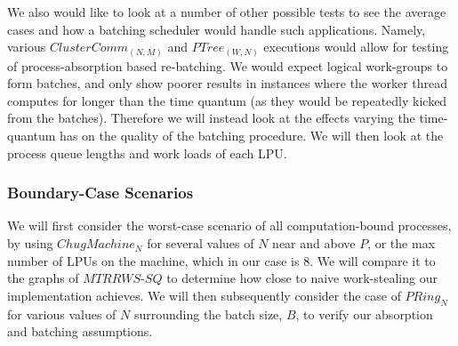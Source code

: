 We also would like to look at a number of other possible tests to see the
average cases and how a batching scheduler would handle such applications.
Namely, various $ClusterComm_{(N,M)}$ and $PTree_{(W,N)}$ executions would allow 
for testing of process-absorption based re-batching. We would expect logical
work-groups to form batches, and only show poorer results in instances where
the worker thread computes for longer than the time quantum (as they would be
repeatedly kicked from the batches). Therefore we will instead look at the
effects varying the time-quantum has on the quality of the batching procedure.
We will then look at the process queue lengths and work loads of each LPU.

\subsubsection{Boundary-Case Scenarios}\label{sec:results-longbatcher-worstcase}

We will first consider the worst-case scenario of all computation-bound processes, by 
using $ChugMachine_N$ for several values of $N$ near and 
above $P$, or the max number of LPUs on the machine, which in our case 
is $8$.  We will 
compare it to the graphs of $MTRRWS$-$SQ$ to determine how close to naive
work-stealing our implementation achieves. We will then subsequently consider
the case of $PRing_N$ for various values of $N$ surrounding the batch size, $B$,
to verify our absorption and batching assumptions.

